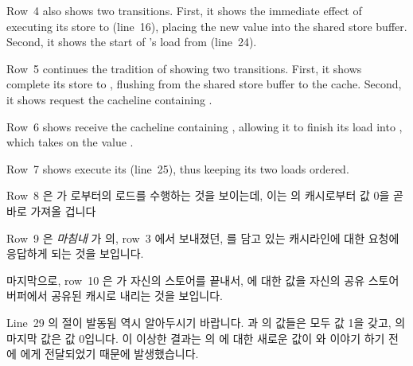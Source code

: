 Row~4 also shows two transitions.
First, it shows the immediate effect of  executing its store to
 (line~16), placing the new value into the shared store buffer.
Second, it shows the start of 's load from  (line~24).

Row~5 continues the tradition of showing two transitions.
First, it shows  complete its store to , flushing
from the shared store buffer to the cache.
Second, it shows  request the cacheline containing .

Row~6 shows  receive the cacheline containing , allowing
it to finish its load into , which takes on the value .

Row~7 shows  execute its  (line~25), thus keeping
its two loads ordered.
\fi

Row~8 은  가  로부터의 로드를 수행하는 것을 보이는데, 이는
 의 캐시로부터 값 0을 곧바로 가져올 겁니다

Row~9 은 \emph{마침내}  가  의, row~3 에서 보내졌던, 
를 담고 있는 캐시라인에 대한 요청에 응답하게 되는 것을 보입니다.

마지막으로, row~10 은  가 자신의 스토어를 끝내서,  에 대한 값을
자신의 공유 스토어 버퍼에서 공유된 캐시로 내리는 것을 보입니다.

Line~29 의  절이 발동됨 역시 알아두시기 바랍니다.
 과  의 값들은 모두 값 1을 갖고,  의 마지막 값은 값
0입니다.
이 이상한 결과는  의  에 대한 새로운 값이  와 이야기
하기 전에  에게 전달되었기 때문에 발생했습니다.

